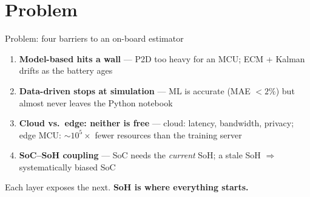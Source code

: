 \documentclass[11pt,aspectratio=169]{beamer}
\begin{document}
\section{Problem}

\begin{frame}{Problem: four barriers to an on-board estimator}
  \begin{enumerate}
    \item \textbf{Model-based hits a wall} --- P2D too heavy for an MCU;
          ECM + Kalman drifts as the battery ages
    \item \textbf{Data-driven stops at simulation} --- ML is accurate (MAE $<2\%$)
          but almost never leaves the Python notebook
    \item \textbf{Cloud vs.\ edge: neither is free} --- cloud: latency, bandwidth,
          privacy; edge MCU: $\sim\!10^5\times$ fewer resources than the training server
    \item \textbf{SoC--SoH coupling} --- SoC needs the \emph{current} SoH;
          a stale SoH $\Rightarrow$ systematically biased SoC
  \end{enumerate}
  \vspace{0.4em}
  \begin{block}{}
    Each layer exposes the next. \textbf{SoH is where everything starts.}
  \end{block}
\end{frame}
\end{document}
